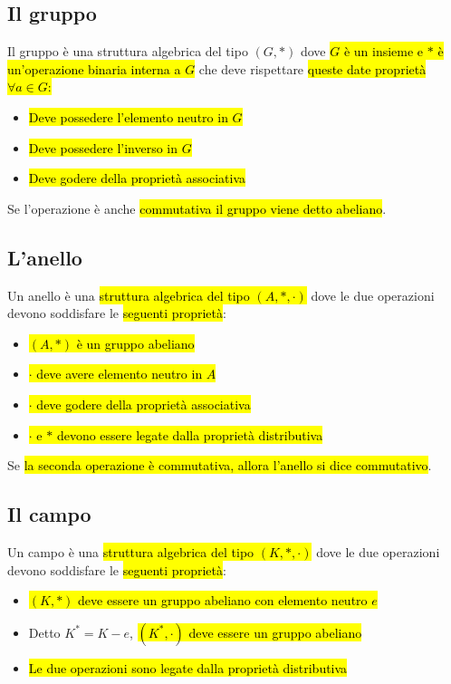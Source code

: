 \subsection{Il gruppo}
Il gruppo è una struttura algebrica del tipo $(G, \ast)$ dove \hl{$G$ è un insieme
e $\ast$ è un'operazione binaria interna a $G$} che deve rispettare \hl{queste 
date proprietà $\forall a \in G$:}
\begin{itemize}
    \item \hl{Deve possedere l'elemento neutro in $G$}
    \item \hl{Deve possedere l'inverso in $G$}
    \item \hl{Deve godere della proprietà associativa}
\end{itemize}
Se l'operazione è anche \hl{commutativa il gruppo viene detto abeliano}.

\subsection{L'anello}
Un anello è una \hl{struttura algebrica del tipo $(A, \ast, \cdot)$} dove le due
operazioni devono soddisfare le \hl{seguenti proprietà}:
\begin{itemize}
    \item \hl{$(A, \ast)$ è un gruppo abeliano}
    \item \hl{$\cdot$ deve avere elemento neutro in $A$}
    \item \hl{$\cdot$ deve godere della proprietà associativa}
    \item \hl{$\cdot$ e $\ast$ devono essere legate dalla proprietà distributiva}
\end{itemize}
Se \hl{la seconda operazione è commutativa, allora l'anello si dice commutativo}.

\subsection{Il campo}
Un campo è una \hl{struttura algebrica del tipo $(K, \ast, \cdot)$} dove le due
operazioni devono soddisfare le \hl{seguenti proprietà}:
\begin{itemize}
    \item \hl{$(K, \ast)$ deve essere un gruppo abeliano con elemento neutro $e$}
    \item Detto $K^* = K - {e}$, \hl{$(K^*, \cdot)$ deve essere un gruppo abeliano}
    \item \hl{Le due operazioni sono legate dalla proprietà distributiva}
\end{itemize}


